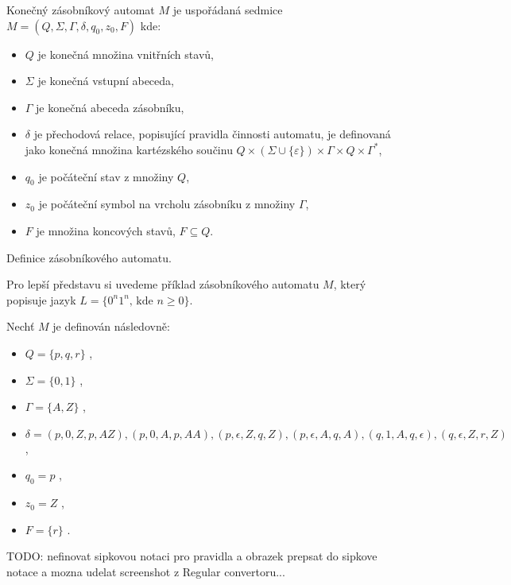\begin{framed}
	\begin{flushleft}Konečný zásobníkový automat \( M \) je uspořádaná sedmice \( M = (Q, \Sigma, \Gamma, \delta, q_0, z_0, F) \) kde:\end{flushleft}
	\begin{itemize}
		\item \( Q \) je konečná množina vnitřních stavů,
		\item \( \Sigma \) je konečná vstupní abeceda,
		\item \( \Gamma \) je konečná abeceda zásobníku,
		\item \( \delta \) je přechodová relace, popisující pravidla činnosti automatu, je definovaná jako konečná množina kartézského součinu \( Q \times (\Sigma \cup \{\varepsilon\} ) \times \Gamma \times Q \times \Gamma^* \),
		\item \( q_0 \) je počáteční stav z množiny \( Q \),
		\item \( z_0 \) je počáteční symbol na vrcholu zásobníku z množiny \( \Gamma \),
		\item \( F \) je množina koncových stavů, \( F \subseteq Q \).
	\end{itemize}
\end{framed}
\begin{mydef}
	Definice zásobníkového automatu.
\end{mydef}

Pro lepší představu si uvedeme příklad zásobníkového automatu \(M\), který popisuje jazyk \( L = \{ 0^n 1^n \text{, kde } n \geq 0 \} \).

Nechť \(M\) je definován následovně:  
\begin{itemize}
	\item \( Q = \{ p, q, r\} \) ,
	\item \( \Sigma = \{0, 1\} \) ,
	\item \( \Gamma =  \{A, Z\}\) ,
	\item \( \delta = (p, 0, Z, p, AZ) , (p,0,A,p,AA), (p,\epsilon,Z,q,Z), (p,\epsilon,A,q,A), (q,1,A,q,\epsilon), (q,\epsilon,Z,r,Z) \),
	\item \( q_0 = p\) ,
	\item \( z_0 = Z \) ,
	\item \( F = \{r\} \) .
\end{itemize}

TODO: nefinovat sipkovou notaci pro pravidla a obrazek prepsat do sipkove notace a mozna udelat screenshot z Regular convertoru...

